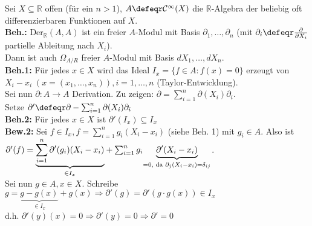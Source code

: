 \begin{nnBsp}
  Sei $X \subseteq \mathbb{R}$ offen (für ein $n>1$), $A \defeqr
  \mathcal{C}^{\infty}(X)$ die $\mathbb{R}$-Algebra der beliebig oft
  differenzierbaren Funktionen auf $X$.\\
  \textbf{Beh.:} $\mbox{Der}_{\mathbb{R}}(A,A)$ ist ein freier $A$-Modul mit
  Basis $\partial_1, \dots , \partial_n$ (mit $\partial_i \defeqr 
  \frac{\partial}{\partial X_i}$ partielle Ableitung nach $X_i$).\\
  Dann ist auch $\Omega_{A/R}$ freier $A$-Modul mit Basis $d X_1, \dots , d
  X_n$.\\
  \textbf{Beh.1:} Für jedes $x \in X$ wird das Ideal $I_x = \{ f \in A: f(x) = 0
  \}$ erzeugt von $X_i - x_i \; (x = (x_1, \dots , x_n)), i = 1 , \dots , n$
  (Taylor-Entwicklung).\\
  Sei nun $\partial: A \to A$ Derivation. Zu zeigen: $\partial = \sum_{i = 1}^n
  \partial(X_i) \partial_i$.\\
  Setze $\partial' \defeqr \partial - \sum_{i = 1}^n \partial(X_i) \partial_i$\\
  \textbf{Beh.2:} Für jedes $x \in X$ ist $\partial'(I_x) \subseteq I_x$\\
  \textbf{Bew.2:} Sei $f \in I_x, f = \sum_{i = 1}^n g_i (X_i - x_i)$ (siehe
  Beh. 1) mit $g_i \in A$. Also ist $\partial'(f) = \underset{\in
  I_x}{\underbrace{\sum_{i = 1}^n
  \partial'(g_i)(X_i - x_i)}} + \sum_{i = 1}^n g_i \underset{\scriptsize=0,
  \mbox{ da } \partial_j(X_i-x_i)=\delta_{ij}}{\underbrace{\partial'(X_i -
  x_i)}}$.\\
  Sei nun $g \in A, x \in X$.
  Schreibe $g = \underset{\in I_x}{\underbrace{g - g(x)}} + g(x) \Rightarrow
  \partial'(g) = \partial'(g \cdot g(x)) \in I_x$\\
  d.h. $\partial'(y)(x) = 0 \Rightarrow \partial'(y) = 0 \Rightarrow \partial' =
  0$
\end{nnBsp}

